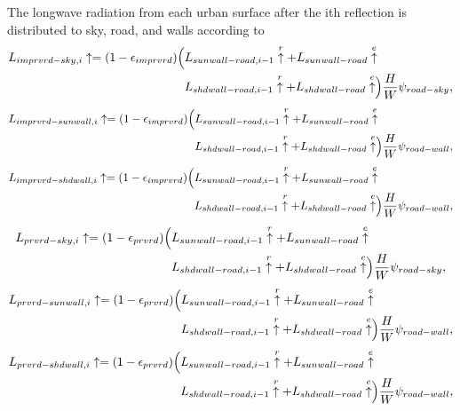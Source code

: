 \documentclass[12pt,authoryear]{elsarticle}
\numberwithin{equation}{section} %
\begin{document}
The longwave radiation from each urban surface after the ith reflection is distributed to sky, road, and walls according to
\begin{equation}
\begin{aligned}
L_{imprvrd-sky,i}\uparrow=(1-\epsilon_{imprvrd})
\Bigl(
&L_{sunwall-road,i-1}\overset{r}{\uparrow}+L_{sunwall-road}\overset{e}{\uparrow} \\
&L_{shdwall-road,i-1}\overset{r}{\uparrow}+L_{shdwall-road}\overset{e}{\uparrow}
\Bigr) \frac{H}{W} \psi_{road-sky},
\end{aligned}
\end{equation}
\begin{equation}
\begin{aligned}
L_{imprvrd-sunwall,i}\uparrow=(1-\epsilon_{imprvrd})
\Bigl(
&L_{sunwall-road,i-1}\overset{r}{\uparrow}+L_{sunwall-road}\overset{e}{\uparrow} \\
&L_{shdwall-road,i-1}\overset{r}{\uparrow}+L_{shdwall-road}\overset{e}{\uparrow}
\Bigr) \frac{H}{W} \psi_{road-wall},
\end{aligned}
\end{equation}
\begin{equation}
\begin{aligned}
L_{imprvrd-shdwall,i}\uparrow=(1-\epsilon_{imprvrd})
\Bigl(
&L_{sunwall-road,i-1}\overset{r}{\uparrow}+L_{sunwall-road}\overset{e}{\uparrow} \\
&L_{shdwall-road,i-1}\overset{r}{\uparrow}+L_{shdwall-road}\overset{e}{\uparrow}
\Bigr) \frac{H}{W} \psi_{road-wall},
\end{aligned}
\end{equation}
\begin{equation}
\begin{aligned}
L_{prvrd-sky,i}\uparrow=(1-\epsilon_{prvrd})
\Bigl(
&L_{sunwall-road,i-1}\overset{r}{\uparrow}+L_{sunwall-road}\overset{e}{\uparrow} \\
&L_{shdwall-road,i-1}\overset{r}{\uparrow}+L_{shdwall-road}\overset{e}{\uparrow}
\Bigr) \frac{H}{W} \psi_{road-sky},
\end{aligned}
\end{equation}
\begin{equation}
\begin{aligned}
L_{prvrd-sunwall,i}\uparrow=(1-\epsilon_{prvrd})
\Bigl(
&L_{sunwall-road,i-1}\overset{r}{\uparrow}+L_{sunwall-road}\overset{e}{\uparrow} \\
&L_{shdwall-road,i-1}\overset{r}{\uparrow}+L_{shdwall-road}\overset{e}{\uparrow}
\Bigr) \frac{H}{W} \psi_{road-wall},
\end{aligned}
\end{equation}
\begin{equation}
\begin{aligned}
L_{prvrd-shdwall,i}\uparrow=(1-\epsilon_{prvrd})
\Bigl(
&L_{sunwall-road,i-1}\overset{r}{\uparrow}+L_{sunwall-road}\overset{e}{\uparrow} \\
&L_{shdwall-road,i-1}\overset{r}{\uparrow}+L_{shdwall-road}\overset{e}{\uparrow}
\Bigr) \frac{H}{W} \psi_{road-wall},
\end{aligned}
\end{equation}
\end{document}
